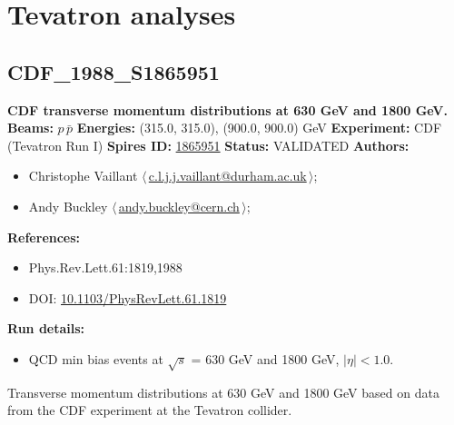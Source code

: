 \section{Tevatron analyses}\subsection[CDF\_1988\_S1865951]{CDF\_1988\_S1865951\,\cite{Abe:1988yu}}
\textbf{CDF transverse momentum distributions at 630 GeV and 1800 GeV.}\newline
\textbf{Beams:} $p$\,$\bar{p}$ \newline
\textbf{Energies:} (315.0, 315.0), (900.0, 900.0) GeV \newline
\textbf{Experiment:} CDF (Tevatron Run I) \newline
\textbf{Spires ID:} \href{http://www.slac.stanford.edu/spires/find/hep/www?rawcmd=key+1865951}{1865951}\newline
\textbf{Status:} VALIDATED\newline
\textbf{Authors:}
\begin{itemize}
  \item Christophe Vaillant $\langle\,$\href{mailto:c.l.j.j.vaillant@durham.ac.uk}{c.l.j.j.vaillant@durham.ac.uk}$\,\rangle$;
  \item Andy Buckley $\langle\,$\href{mailto:andy.buckley@cern.ch}{andy.buckley@cern.ch}$\,\rangle$;
\end{itemize}
\textbf{References:}
\begin{itemize}
  \item Phys.Rev.Lett.61:1819,1988
  \item DOI: \href{http://dx.doi.org/10.1103/PhysRevLett.61.1819}{10.1103/PhysRevLett.61.1819}
\end{itemize}
\textbf{Run details:}
\begin{itemize}

  \item QCD min bias events at \ensuremath{\sqrt{s}} = 630 GeV and 1800 GeV, $|\eta| < 1.0$.\end{itemize}

\noindent Transverse momentum distributions at 630 GeV and 1800 GeV based on data from the CDF experiment at the Tevatron collider.

\clearpage


\clearpage

